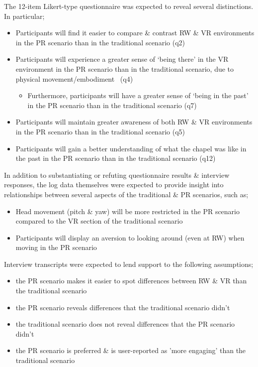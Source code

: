 The 12-item Likert-type questionnaire was expected to reveal several distinctions. In particular;
\begin{itemize}
	\item Participants will find it easier to compare \& contrast RW \& VR environments in the PR scenario than in the traditional scenario (q2)
	\item Participants will experience a greater  sense of `being there' in the VR environment in the PR scenario than in the traditional scenario, due to physical movement/embodiment~\cite{Groten2011} (q4)
	\begin{itemize}
		\item Furthermore, participants will have a greater sense of `being in the past' in the PR scenario than in the traditional scenario (q7)
	\end{itemize}
	\item Participants will maintain greater awareness of both RW \& VR environments in the PR scenario than in the traditional scenario (q5)
	\item Participants will gain a better understanding of what the chapel was like in the past in the PR scenario than in the traditional scenario (q12)
\end{itemize}

In addition to substantiating or refuting questionnaire results \& interview responses, the log data themselves were expected to provide insight into relationships between several aspects of the traditional \& PR scenarios, such as;
\begin{itemize}
	\item Head movement (pitch \& yaw) will be more restricted in the PR scenario compared to the VR section of the traditional scenario
	\item Participants will display an aversion to looking around (even at RW) when moving in the PR scenario
\end{itemize}

Interview transcripts were expected to lend support to the following assumptions;
\begin{itemize}
	\item the PR scenario makes it easier to spot differences between RW \& VR than the traditional scenario
	\item the PR scenario reveals differences that the traditional scenario didn't
	\item the traditional scenario does not reveal differences that the PR scenario didn't
	\item the PR scenario is preferred \& is user-reported as 'more engaging' than the traditional scenario
\end{itemize}

